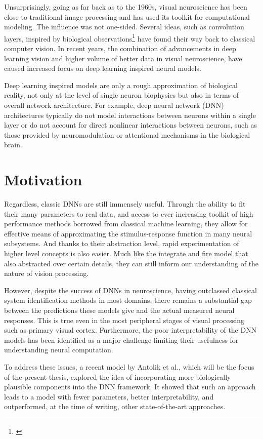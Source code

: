 Unsurprisingly, going as far back as to the 1960s, visual neuroscience has been close to traditional image processing and has used its toolkit for computational modeling. The influence was not one-sided. Several ideas, such as convolution layers, inspired by biological observations\footnote{\cite{Lindsay_2020}} have found their way back to classical computer vision. In recent years, the combination of advancements in deep learning vision and higher volume of better data in visual neuroscience, have caused increased focus on deep learning inspired neural models. 

Deep learning inspired models are only a rough approximation of biological reality, not only at the level of single neuron biophysics but also in terms of overall network architecture. For example, deep neural network (DNN) architectures typically do not model interactions between neurons within a single layer or do not account for direct nonlinear interactions between neurons, such as those provided by neuromodulation or attentional mechanisms in the biological brain. 

\section*{Motivation}
Regardless, classic DNNs are still immensely useful. Through the ability to fit their many parameters to real data, and access to ever increasing toolkit of high performance methods borrowed from classical machine learning, they allow for effective means of approximating the stimulus-response function in many neural subsystems. And thanks to their abstraction level, rapid experimentation of higher level concepts is also easier. Much like the integrate and fire model that also abstracted over certain details, they can still inform our understanding of the nature of vision processing. 

However, despite the success of DNNs in neuroscience, having outclassed classical system identification methods in most domains, there remains a substantial gap between the predictions these models give and the actual measured neural responses. This is true even in the most peripheral stages of visual processing such as primary visual cortex. Furthermore, the poor interpretability of the DNN models has been identified as a major challenge limiting their usefulness for understanding neural computation.

To address these issues, a recent model by Antolik et al., which will be the focus of the present thesis, explored the idea of incorporating more biologically plausible components into the DNN framework. It showed that such an approach leads to a model with fewer parameters, better interpretability, and outperformed, at the time of writing, other state-of-the-art approaches. 

